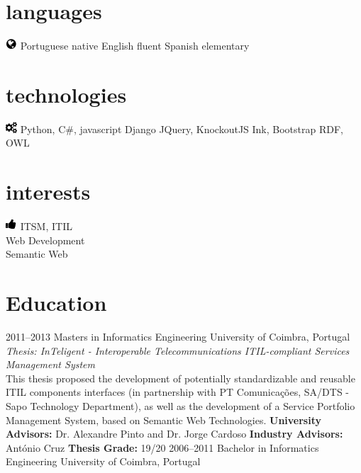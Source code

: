 \documentclass[]{friggeri-cv} %
\begin{document}
\begin{aside}
\section{languages}
\includegraphics[scale=0.5, left]{globe.png}
\vspace{-5mm} Portuguese native
English fluent
Spanish elementary
\section{technologies}
\includegraphics[scale=0.5, left]{cogs.png}
\vspace{-5mm}  Python, C\#, javascript
Django
JQuery, KnockoutJS
Ink, Bootstrap
RDF, OWL
\section{interests}
\includegraphics[scale=0.5, left]{like.png}
\vspace{-5mm} ITSM, ITIL\\ Web Development\\ Semantic Web
\end{aside}





\section{Education}

\begin{entrylist}
\entrymasters
{2011--2013}
{Masters {\normalfont in Informatics Engineering}}
{University of Coimbra, Portugal}
{\emph{Thesis: InTeligent - Interoperable Telecommunications ITIL-compliant Services Management System} \\ This thesis proposed the development of potentially standardizable and reusable ITIL components interfaces (in partnership with PT Comunicações, SA/DTS - Sapo Technology Department), as well as the development of a Service Portfolio Management System, based on Semantic Web Technologies.}
{\textbf{University Advisors:} Dr. Alexandre Pinto and Dr. Jorge Cardoso}
{\textbf{Industry Advisors:} António Cruz}
{\textbf{Thesis Grade:} 19/20}
\entrybachelor
{2006--2011}
{Bachelor {\normalfont in Informatics Engineering}}
{University of Coimbra, Portugal}
\end{entrylist}
\end{document}

